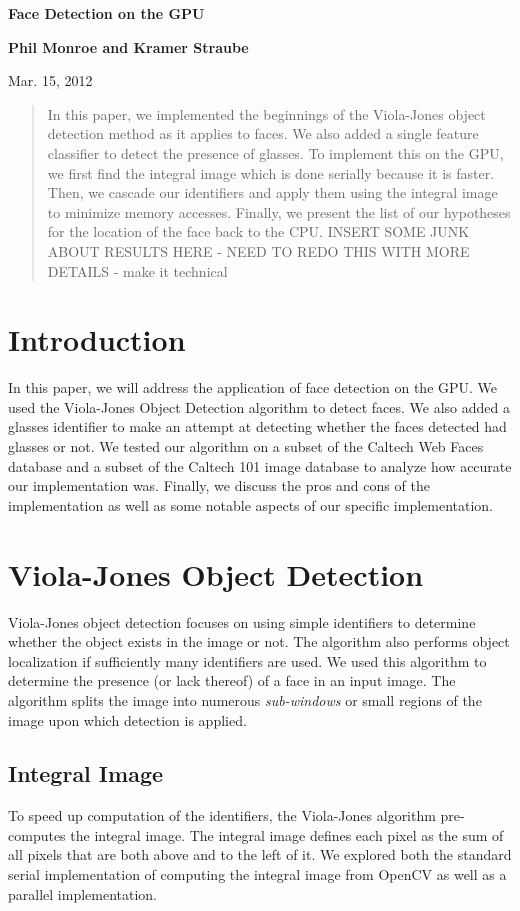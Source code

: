 \documentclass[12pt] {article}
\begin{document}
\centerline{\Large \bf Face Detection on the GPU}

\centerline{\bf Phil Monroe and Kramer Straube}

\centerline{Mar. 15, 2012}
\bigskip

\begin{abstract}
In this paper, we implemented the beginnings of the Viola-Jones object detection method as it applies to faces. We also added a single feature classifier to detect the presence of glasses. To implement this on the GPU, we first find the integral image which is done serially because it is faster. Then, we cascade our identifiers and apply them using the integral image to minimize memory accesses. Finally, we present the list of our hypotheses for the location of the face back to the CPU. INSERT SOME JUNK ABOUT RESULTS HERE - NEED TO REDO THIS WITH MORE DETAILS - make it technical
\end{abstract}

\section{Introduction}
In this paper, we will address the application of face detection on the GPU. We used the Viola-Jones Object Detection algorithm to detect faces. We also added a glasses identifier to make an attempt at detecting whether the faces detected had glasses or not. We tested our algorithm on a subset of the Caltech Web Faces database and a subset of the Caltech 101 image database to analyze how accurate our implementation was. Finally, we discuss the pros and cons of the implementation as well as some notable aspects of our specific implementation.


\section{Viola-Jones Object Detection}
Viola-Jones object detection focuses on using simple identifiers to determine whether the object exists in the image or not. The algorithm also performs object localization if sufficiently many identifiers are used. We used this algorithm to determine the presence (or lack thereof) of a face in an input image. The algorithm splits the image into numerous \emph{sub-windows} or small regions of the image upon which detection is applied.

\subsection{Integral Image}
To speed up computation of the identifiers, the Viola-Jones algorithm pre-computes the integral image. The integral image defines each pixel as the sum of all pixels that are both above and to the left of it. We explored both the standard serial implementation of computing the integral image from OpenCV as well as a parallel implementation.
\end{document}
